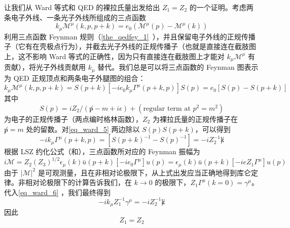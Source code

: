 让我们从 Ward 等式和 QED 的裸拉氏量出发给出 $Z_1=Z_2$ 的一个证明。考虑两条电子外线、一条光子外线所组成的三点函数
\begin{equation}
k_\mu \mathcal{M}^\mu(k,p,p+k)=e_0(\mathcal{M}^{\mu}(p)- \mathcal{M}^{\mu}(k))
\end{equation}
利用三点函数 Feynman 规则（\autoref{the_qedfey_1}~），并且保留电子外线的正规传播子（它有在壳极点行为），并截去光子外线的正规传播子（也就是直接连在截肢图上，这不影响 Ward 等式的正确性，因为只有直接连在截肢图上才能对 $k_\mu \mathcal{M}^\mu$ 有贡献），将光子外线贡献用 $k_\mu$ 替代。我们总是可以将三点函数的 Feynman 图表示为 QED 正规顶点和两条电子外腿图的组合：
\begin{equation}\label{eq_ward_5}
k_\mu \mathcal{M}^\mu(k,p,p+k) = S(p+k) [-ie_0k_\mu \Gamma^\mu(p+k,p)] S(p) =e_0[S(p)-S(p+k)]
\end{equation}
其中
\begin{equation}
S(p)=iZ_2/(\not p-m+i\epsilon)+(\text{regular term at } p^2=m^2)
\end{equation}
为电子的正规传播子（两点编时格林函数），$Z_2$ 为裸拉氏量的正规传播子在 $\not p=m$ 处的留数。对\autoref{eq_ward_5} 两边除以 $S(p)S(p+k)$，可以得到
\begin{equation}\label{eq_ward_6}
-ik_\mu \Gamma^\mu(p+k,p) = [S(p+k)^{-1}-S(p)^{-1}]= -i Z_2^{-1}\not k
\end{equation}
根据 LSZ 约化公式（和），三点函数所对应的 Feynman 振幅为
\begin{equation}
i\mathcal{M} = Z_2(Z_3)^{1/2}\epsilon_\mu(k)\bar u(p+k)[-ie_0\Gamma^\mu] u(p)=\epsilon_\mu(k)\bar u(p+k)[-i e Z_1\Gamma^\mu] u(p)
\end{equation}
由于 $|\mathcal{M}|^2$ 是可观测量，且在非相对论极限下，从上式出发应当正确地得到库仑定律。非相对论极限下的计算告诉我们，在 $k\rightarrow 0$ 的极限下，$Z_1 \Gamma^\mu(k=0) = \gamma^\mu$。代入\autoref{eq_ward_6} ，我们最终得到
\begin{equation}
-i k_\mu Z_1^{-1} \gamma^\mu = -i Z_2^{-1}\not k
\end{equation}
因此
\begin{equation}
Z_1=Z_2
\end{equation}

